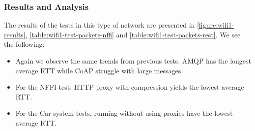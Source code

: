 \subsubsection{Results and Analysis}

The results of the tests in this type of network are presented in
\cref{figure:wifi1-results}, \cref{table:wifi1-test-packets-nffi} and
\cref{table:wifi1-test-packets-rest}. We see the following:

\begin{itemize}

    \item Again we observe the same trends from previous tests. AMQP has the
    longest average RTT while CoAP struggle with large messages.

    \item For the NFFI test, HTTP proxy with compression yields the lowest
    average RTT.

    \item For the Car system tests, running without using proxies have the
    lowest average RTT.

\end{itemize}


\begin{landscape}
    \begin{figure}
    \centering
    \begin{floatrow}
    \end{floatrow}
    \end{figure}
\end{landscape}

